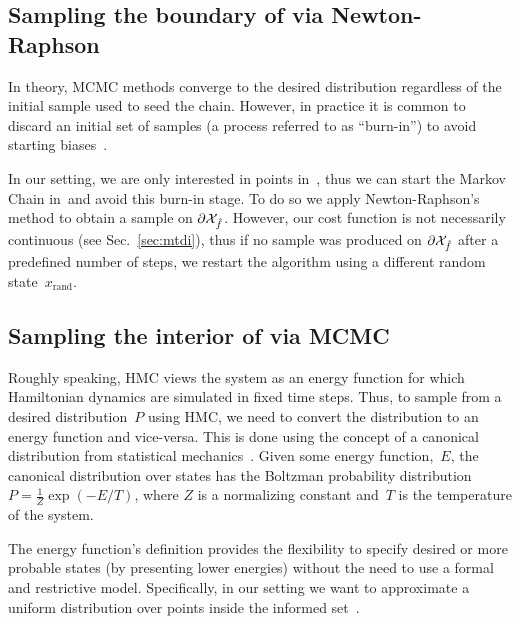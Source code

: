 \documentclass[letterpaper, 10 pt, conference]{ieeeconf}  %
\begin{document}

\subsection{Sampling the boundary of \Cinf via Newton-Raphson}
\label{subsec:grad}
In theory, MCMC methods converge to the desired distribution regardless of the initial sample used to seed the chain.
However, in practice it is common to discard an initial set of samples (a process referred to as ``burn-in'') to avoid starting biases~\cite{ADDJ03}. 

In our setting, we are only interested in points in~\Cinf, thus we can start the Markov Chain in~\Cinf and avoid this burn-in stage. 
To do so we apply  Newton-Raphson's method to obtain a sample on $\partial \mathcal{X}_{\hat{f}}$. 
However, our cost function is not necessarily continuous (see Sec.~\ref{sec:mtdi}), thus if no sample was produced on $\partial \mathcal{X}_{\hat{f}}$ after a predefined number of steps, we restart the algorithm using a different random state~$x_\text{rand}$.


\subsection{Sampling the interior of \Cinf via
MCMC}
\label{subsec:mcmc}


	Roughly speaking, HMC views the system as an energy function for which Hamiltonian dynamics are simulated in fixed time steps.
	Thus, to sample from a desired distribution~$P$ using HMC, we need to convert the distribution to an energy function and vice-versa.
	This is done using the concept of a canonical distribution from statistical mechanics~\cite{N11}. 
	Given some energy function,~$E$, the canonical distribution over states has the Boltzman probability distribution $P = \frac{1}{Z}\exp (-E/T)$, where $Z$ is a normalizing constant and~$T$ is the temperature of the system.

The energy function's definition provides the flexibility to specify desired or more probable states (by presenting lower energies) without the need to use a formal and restrictive model. 
Specifically, in our setting we want to approximate 
a uniform distribution over points inside the informed set~\Cinf.
\end{document}
